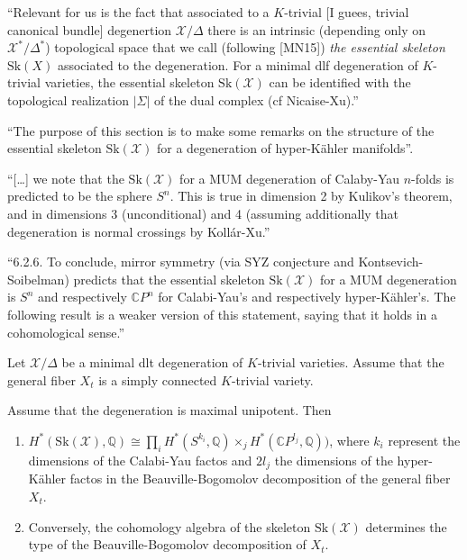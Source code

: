 ``Relevant for us is the fact that associated
to a $K$-trivial [I guees, trivial canonical
bundle] degenertion $\mathcal{X}/\Delta$
there is an intrinsic (depending only on
$\mathcal{X}^* /\Delta^*$) topological space
that we call (following [MN15]) {\it the
essential skeleton} $\text{Sk}(X)$ associated
to the degeneration. For a minimal dlf
degeneration of $K$-trivial varieties, the
essential skeleton $\text{Sk}(\mathcal{X})$
can be identified with the topological
realization $|\Sigma|$ of the dual complex
(cf Nicaise-Xu).''

``The purpose of this section is to make some
remarks on the structure of the essential
skeleton $\text{Sk}(\mathcal{X})$ for a
degeneration of hyper-Kähler manifolds''.

``[…] we note that the
$\text{Sk}(\mathcal{X})$ for a MUM
degeneration of Calaby-Yau $n$-folds is
predicted to be the sphere $S^n$. This is
true in dimension 2 by Kulikov's theorem, and
in dimensions 3 (unconditional) and 4
(assuming additionally that degeneration is
normal crossings by Kollár-Xu.''

``6.2.6. To conclude, mirror symmetry (via
SYZ conjecture and Kontsevich-Soibelman)
predicts that the essential skeleton
$\text{Sk}(\mathcal{X})$ for a MUM
degeneration is $S^n$ and respectively
$\mathbb{C}P^n$ for Calabi-Yau's and
respectively hyper-Kähler's. The following
result is a weaker version of this statement,
saying that it holds in a cohomological
sense.''

\begin{theorem}
\label{theorem-skeleton-cohomology}
\begin{reference}
\cite[Theorem 6.14]{KLSV}
\end{reference}
Let $\mathcal{X}/\Delta$ be a minimal dlt
degeneration of $K$-trivial varieties.
Assume that the general fiber $X_t$ 
is a simply connected $K$-trivial variety.

Assume that the degeneration is maximal unipotent.
Then
\begin{enumerate}
\item $H^* (\text{Sk}(\mathcal{X}),\mathbb{Q})
\cong \prod_iH^* (S^{k_i},\mathbb{Q})
\times_jH^* (\mathbb{C}P^{l_j},\mathbb{Q}))$,
where $k_i$ represent the dimensions
of the Calabi-Yau factos and $2l_j$ 
the dimensions of the hyper-Kähler factos
in the Beauville-Bogomolov decomposition of the general fiber $X_t$.

\item Conversely, the cohomology algebra
of the skeleton $\text{Sk}(\mathcal{X})$ 
determines the type of the Beauville-Bogomolov
decomposition of $X_t$.
\end{enumerate}
\end{theorem}



